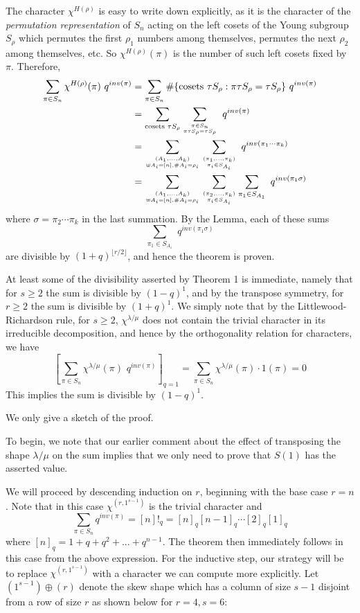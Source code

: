   The character $\chi^{H(\rho)}$ is easy to write down explicitly,
as it is the character of the {\it permutation representation}
of $S_n$ acting on the left cosets of the Young subgroup $S_\rho$
which permutes the first $\rho_1$ numbers among themselves, permutes
the next $\rho_2$ among themselves, etc.  So $\chi^{H(\rho)}(\pi)$ is
the number of such left cosets fixed by $\pi$.  Therefore,
$$
\aligned
\sum_{\pi \in S_n} \chi^{H(\rho)}(\pi) \,\, q^{inv(\pi)}
 &= \sum_{\pi \in S_n}
      \#\{\text{cosets }\tau S_\rho: \pi \tau S_\rho = \tau S_\rho\}
      \,\, q^{inv(\pi)} \\
 &= \sum_{\text{cosets }\tau S_\rho}
        \sum_{\pi \in S_n \atop \pi \tau S_\rho = \tau S_\rho}
         \,\, q^{inv(\pi)} \\
 &=\sum_{(A_1,\ldots,A_k) \atop \uplus A_i = [n], \#A_i=\rho_i}
       \sum_{(\pi_1,\ldots,\pi_k) \atop \pi_i \in S_{A_i}} 
         \,\, q^{inv(\pi_1 \cdots \pi_k)} \\
 &=\sum_{(A_1,\ldots,A_k) \atop \uplus A_i = [n], \#A_i=\rho_i}
       \sum_{(\pi_2,\ldots,\pi_k) \atop \pi_i \in S_{A_i}}
       \sum_{\pi_1 \in S_{A_1}}  
         \,\, q^{inv(\pi_1 \sigma)} 
\endaligned
$$
where $\sigma = \pi_2 \cdots \pi_k$ in the last summation.
By the Lemma, each of these sums
$$\sum_{\pi_1 \in S_{A_1}}  
         \,\, q^{inv(\pi_1 \sigma)}$$
are divisible by $(1+q)^{\lfloor r/2 \rfloor}$, and hence
the theorem is proven.
\endproof

At least some of the divisibility asserted by Theorem 1 is immediate,
namely that for $s \geq 2$ the sum is divisible by $(1-q)^1$, and
by the transpose symmetry, for $r \geq 2$ the sum is divisible by $(1+q)^1$.
We simply note that by the Littlewood-Richardson rule, for $s \ge 2$,
$\chi^{\lambda/\mu}$ does not contain the trivial character in
its irreducible decomposition, and hence by the orthogonality
relation for characters, we have
$$\left[ 
\sum_{\pi \in S_n} \chi^{\lambda/\mu}(\pi) \,\, q^{inv(\pi)}
\right]_{q=1}
= \sum_{\pi \in S_n} \chi^{\lambda/\mu}(\pi) \cdot 1(\pi)
= 0
$$
This implies the sum is divisible by $(1-q)^1$.
\endrem


We only give a sketch of the proof.
 
  To begin, we note that our earlier comment about the effect of
transposing the shape $\lambda/\mu$ on the sum implies that
we only need to prove that $S(1)$ has the asserted value.
 
  We will proceed by descending induction on $r$, beginning with
the base case $r=n$.  Note that in this case $\chi^{(r,1^{s-1})}$
is the trivial character and 
$$
\sum_{\pi \in S_n} q^{inv(\pi)} 
= [n]!_q = [n]_q [n-1]_q \cdots [2]_q [1]_q
$$
where $[n]_q = 1 + q + q^2 + ... + q^{n-1}$.
The theorem then immediately follows in this case from the
above expression.
  For the inductive step, our strategy will be to replace
$\chi^{(r,1^{s-1})}$ with a character we can compute more explicitly.
Let $(1^{s-1}) \oplus (r)$ denote the skew shape which
has a column of size $s-1$ disjoint from a row of size $r$ as shown
below for $r=4, s=6$:


